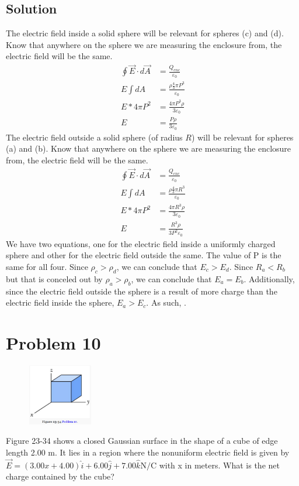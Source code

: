 \documentclass[12pt]{article}
\begin{document}
\subsection{Solution}
The electric field inside a solid sphere will be relevant for spheres (c) and (d). Know that anywhere on the sphere we are measuring the enclosure from, the electric field will be the same.
\begin{align*}
    \oint \vec{E} \cdot d\vec{A}    &=  \frac{Q_{enc}}{\varepsilon_0}\\
    E \int dA  &=  \frac{\rho \frac{4}{3}\pi P^3}{\varepsilon_0}\\
    E * 4\pi P^2    &=  \frac{4\pi P^3 \rho}{3 \varepsilon_0}\\
    E   &=  \frac{P \rho}{3 \varepsilon_0}
\end{align*}
The electric field outside a solid sphere (of radius $R$) will be relevant for spheres (a) and (b). Know that anywhere on the sphere we are measuring the enclosure from, the electric field will be the same.
\begin{align*}
    \oint \vec{E} \cdot d\vec{A}    &=  \frac{Q_{enc}}{\varepsilon_0}\\
    E \int dA   &=  \frac{\rho \frac{4}{3}\pi R^3}{\varepsilon_0}\\
    E * 4\pi P^2    &=  \frac{4\pi R^3 \rho}{3\varepsilon_0}\\
    E   &=  \frac{R^3 \rho}{3 P^2 \varepsilon_0}
\end{align*}
We have two equations, one for the electric field inside a uniformly charged sphere and other for the electric field outside the same. 
The value of P is the same for all four.
Since $\rho_c > \rho_d$, we can conclude that $E_c > E_d$.
Since $R_a < R_b$ but that is conceled out by $\rho_a > \rho_b$, we can conclude that $E_a = E_b$.
Additionally, since the electric field outside the sphere is a result of more charge than the electric field inside the sphere, $E_a > E_c$. 
As such, .


\pagebreak
\section{Problem 10}
\begin{figure}
    \vspace{-50pt}
    \includegraphics[width=0.25\textwidth]{picture_5.png} 
\end{figure}
Figure 23-34 shows a closed Gaussian surface in the shape of a cube of edge length 2.00 m. It lies in a region where the nonuniform electric field is given by $\vec{E} = (3.00x + 4.00)\hat{i} + 6.00\hat{j} + 7.00\hat{k} \unit{\newton/\coulomb}$ with x in meters. What is the net charge contained by the cube?
\end{document}

